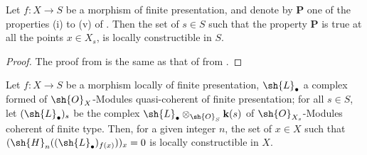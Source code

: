 \begin{corollary}[9.9.5]
\label{IV.9.9.5}
Let $f:X\to S$ be a morphism of finite presentation, and denote by $\mathbf{P}$ one of the properties (i) to (v) of .
Then the set of $s\in S$ such that the property $\mathbf{P}$ is true at all the points $x\in X_s$, is locally constructible in $S$.
\end{corollary}

\begin{proof}
\label{IV.9.9.5-proof}
The proof from  is the same as that of  from .
\end{proof}

\begin{proposition}[9.9.6]
\label{IV.9.9.6}
Let $f:X\to S$ be a morphism locally of finite presentation, $\sh{L}_\bullet$ a complex formed of $\sh{O}_X$-Modules quasi-coherent of finite presentation; for all $s\in S$, let $(\sh{L}_\bullet)_s$ be the complex $\sh{L}_\bullet\otimes_{\sh{O}_S}\mathbf{k}(s)$ of $\sh{O}_{X_s}$-Modules coherent of finite type.
Then, for a given integer $n$, the set of $x\in X$ such that $(\sh{H}_n((\sh{L}_\bullet)_{f(x)}))_x=0$ is locally constructible in $X$.
\end{proposition}

